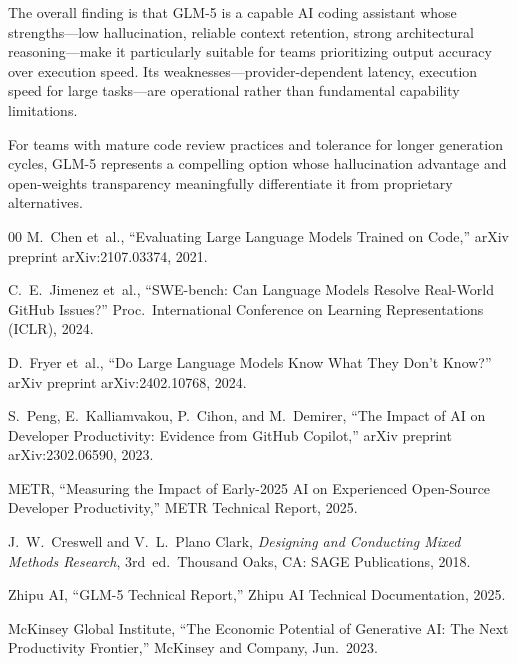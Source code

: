 \documentclass[conference]{IEEEtran}
\begin{document}
The overall finding is that GLM-5 is a capable AI coding assistant whose strengths---low hallucination, reliable context retention, strong architectural reasoning---make it particularly suitable for teams prioritizing output accuracy over execution speed. Its weaknesses---provider-dependent latency, execution speed for large tasks---are operational rather than fundamental capability limitations.

For teams with mature code review practices and tolerance for longer generation cycles, GLM-5 represents a compelling option whose hallucination advantage and open-weights transparency meaningfully differentiate it from proprietary alternatives.

\begin{thebibliography}{00}
M.~Chen et~al., ``Evaluating Large Language Models Trained on Code,'' arXiv preprint arXiv:2107.03374, 2021.

C.~E.~Jimenez et~al., ``SWE-bench: Can Language Models Resolve Real-World GitHub Issues?'' Proc.\ International Conference on Learning Representations (ICLR), 2024.

D.~Fryer et~al., ``Do Large Language Models Know What They Don't Know?'' arXiv preprint arXiv:2402.10768, 2024.

S.~Peng, E.~Kalliamvakou, P.~Cihon, and M.~Demirer, ``The Impact of AI on Developer Productivity: Evidence from GitHub Copilot,'' arXiv preprint arXiv:2302.06590, 2023.

METR, ``Measuring the Impact of Early-2025 AI on Experienced Open-Source Developer Productivity,'' METR Technical Report, 2025.

J.~W.~Creswell and V.~L.~Plano Clark, \textit{Designing and Conducting Mixed Methods Research}, 3rd~ed.\ Thousand Oaks, CA: SAGE Publications, 2018.

Zhipu AI, ``GLM-5 Technical Report,'' Zhipu AI Technical Documentation, 2025.

McKinsey Global Institute, ``The Economic Potential of Generative AI: The Next Productivity Frontier,'' McKinsey and Company, Jun.\ 2023.

\end{thebibliography}
\end{document}
